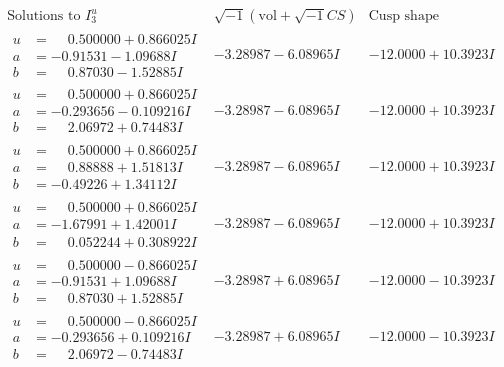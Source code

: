\documentclass[1p]{elsarticle_modified}
\theoremstyle{definition}
\newcommand{\I}{\sqrt{-1}}
\begin{document}
$$\begin{array}{c|c|c}  
\text{Solutions to }I^u_{3}& \I (\text{vol} + \sqrt{-1}CS) & \text{Cusp shape}\\
 \hline 
\begin{aligned}
u &= \phantom{-}0.500000 + 0.866025 I \\
a &= -0.91531 - 1.09688 I \\
b &= \phantom{-}0.87030 - 1.52885 I\end{aligned}
 & -3.28987 - 6.08965 I & -12.0000 + 10.3923 I \\ \hline\begin{aligned}
u &= \phantom{-}0.500000 + 0.866025 I \\
a &= -0.293656 - 0.109216 I \\
b &= \phantom{-}2.06972 + 0.74483 I\end{aligned}
 & -3.28987 - 6.08965 I & -12.0000 + 10.3923 I \\ \hline\begin{aligned}
u &= \phantom{-}0.500000 + 0.866025 I \\
a &= \phantom{-}0.88888 + 1.51813 I \\
b &= -0.49226 + 1.34112 I\end{aligned}
 & -3.28987 - 6.08965 I & -12.0000 + 10.3923 I \\ \hline\begin{aligned}
u &= \phantom{-}0.500000 + 0.866025 I \\
a &= -1.67991 + 1.42001 I \\
b &= \phantom{-}0.052244 + 0.308922 I\end{aligned}
 & -3.28987 - 6.08965 I & -12.0000 + 10.3923 I \\ \hline\begin{aligned}
u &= \phantom{-}0.500000 - 0.866025 I \\
a &= -0.91531 + 1.09688 I \\
b &= \phantom{-}0.87030 + 1.52885 I\end{aligned}
 & -3.28987 + 6.08965 I & -12.0000 - 10.3923 I \\ \hline\begin{aligned}
u &= \phantom{-}0.500000 - 0.866025 I \\
a &= -0.293656 + 0.109216 I \\
b &= \phantom{-}2.06972 - 0.74483 I\end{aligned}
 & -3.28987 + 6.08965 I & -12.0000 - 10.3923 I \\ \hline\begin{aligned}

\end{aligned}
\end{array}$$
\end{document}
